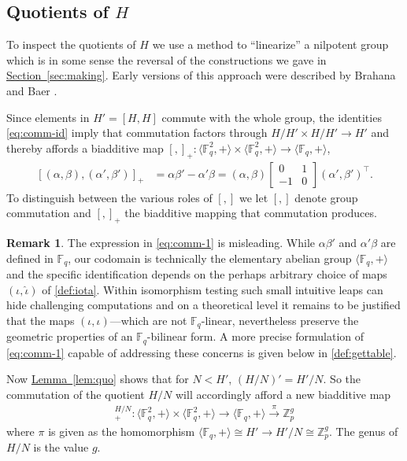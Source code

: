 \documentclass[11pt]{article}
\numberwithin{equation}{section}
\theoremstyle{definition}
\newtheorem{remark}[theorem]{Remark}
\theoremstyle{plain}
\newcommand{\expref}[2]{\hyperref[#2]{#1~\ref{#2}}}
\numberwithin{equation}{section}
\theoremstyle{plain}       %
\theoremstyle{remark}
\theoremstyle{definition}
\numberwithin{figure}{section}
\numberwithin{table}{section}
\newcommand{\bbF}{\mathbb{F}}  %
\begin{document}
\subsection{Quotients of \texorpdfstring{$H$}{H}}
To inspect the quotients of $H$ we  use a method to ``linearize'' a nilpotent
group which is in some sense the reversal of the constructions we gave in
\expref{Section}{sec:making}.  Early versions of this approach were described by
Brahana and Baer \cite{Baer, Brahana}.

Since elements in $H'=[H,H]$ commute with the whole group, the identities
\eqref{eq:comm-id} imply that commutation factors through $H/H'\times H/H'\to
H'$ and thereby affords a biadditive map 
$[,]_+:\langle \bbF_q^2,+\rangle\times \langle \bbF_q^2,+\rangle\to 
		\langle \bbF_q,+\rangle$,
\begin{align}\label{eq:comm-1}
	[(\alpha,\beta),(\alpha',\beta')]_+ & = \alpha \beta'-\alpha'\beta
		=(\alpha,\beta)\begin{bmatrix} 0 & 1\\ -1 & 0\end{bmatrix} 
			(\alpha',\beta')^{\top}.
\end{align}
To distinguish between the various roles of $[,]$ we let $[,]$ denote group
commutation and $[,]_+$ the biadditive mapping that commutation produces.

\begin{remark}\label{rem:iota}
  The expression in \eqref{eq:comm-1} is misleading.  While
  $\alpha\beta'$ and $\alpha'\beta$ are defined in $\bbF_{q}$, our
  codomain is technically the elementary abelian group
  $\langle \bbF_{q},+\rangle$ and the specific identification depends
  on the perhaps arbitrary choice of maps $(\iota,\hat{\iota})$ of
  \eqref{def:iota}.  Within isomorphism testing such small intuitive
  leaps can hide challenging computations and on a theoretical level
  it remains to be justified that the maps
  $(\iota,\hat{\iota})$---which are not $\bbF_{q}$-linear,
  nevertheless preserve the geometric properties of an
  $\bbF_{q}$-bilinear form.  A more precise formulation of
  \eqref{eq:comm-1} capable of addressing these concerns is given
  below in \eqref{def:gettable}.
\end{remark}

Now \expref{Lemma}{lem:quo} shows that for $N<H'$, $(H/N)'=H'/N$.  So the
commutation of the quotient $H/N$ will accordingly afford a new biadditive map
\begin{align*}
	[,]_+^{H/N}:\langle \bbF_q^2,+\rangle\times \langle \bbF_q^2,+\rangle\to 
		\langle \bbF_q,+\rangle
	\overset{\pi}{\to} \mathbb{Z}_p^g 
\end{align*}
where $\pi$ is given as the homomorphism $\langle \bbF_q,+\rangle\cong H'\to
H'/N\cong \mathbb{Z}_p^g$. The genus of $H/N$ is the value $g$.  
\end{document}
